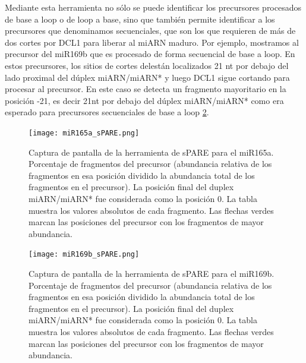 Mediante esta herramienta no sólo se puede identificar los precursores procesados de base a loop o de loop a base, sino que también permite identificar a los precursores que denominamos secuenciales, que son los que requieren de más de dos cortes por DCL1 para liberar al miARN maduro.
Por ejemplo, mostramos al precursor del miR169b que es procesado de forma secuencial de base a loop.
En estos precursores, los sitios de cortes delestán localizados 21 nt por debajo del lado proximal del dúplex miARN/miARN* y luego DCL1 sigue cortando para procesar al precursor.
En este caso se detecta un fragmento mayoritario en la posición -21, es decir 21nt por debajo del dúplex miARN/miARN* como era esperado para precursores secuenciales de base a loop \ref{fig:miR169b_sPARE}.


\begin{landscape}
    \begin{figure}[htbp!] 
        \centering    
        \texttt{[image: miR165a\_sPARE.png]}
        \caption[Captura de pantalla de la herramienta de sPARE para el miR165a]{Captura de pantalla de la herramienta de sPARE para el miR165a.
        Porcentaje de fragmentos del precursor (abundancia relativa de los fragmentos en esa posición dividido la abundancia total de los fragmentos en el precursor).
        La posición final del duplex miARN/miARN* fue considerada como la posición 0.
        La tabla muestra los valores absolutos de cada fragmento.
        Las flechas verdes marcan las posiciones del precursor con los fragmentos de mayor abundancia. 
        }
         \label{fig:miR165a_sPARE}
    \end{figure}
\end{landscape}


\begin{landscape}
\begin{figure}[htbp!] 
        \centering    
        \texttt{[image: miR169b\_sPARE.png]}
        \caption[Captura de pantalla de la herramienta de sPARE para el miR169b]{Captura de pantalla de la herramienta de sPARE para el miR169b.
        Porcentaje de fragmentos del precursor (abundancia relativa de los fragmentos en esa posición dividido la abundancia total de los fragmentos en el precursor).
        La posición final del duplex miARN/miARN* fue considerada como la posición 0.
        La tabla muestra los valores absolutos de cada fragmento.
        Las flechas verdes marcan las posiciones del precursor con los fragmentos de mayor abundancia. 
        }
	 \label{fig:miR169b_sPARE}
    \end{figure}
\end{landscape}

